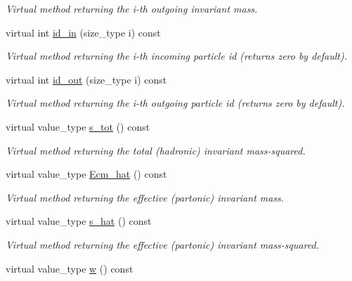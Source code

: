 \begin{DoxyCompactItemize}
\begin{DoxyCompactList}\small\item\em Virtual method returning the i-\/th outgoing invariant mass. \end{DoxyCompactList}\item 
virtual int \hyperlink{a00442_a93226df13fcf52eb52b5b8d894885462}{id\-\_\-in} (size\-\_\-type i) const 
\begin{DoxyCompactList}\small\item\em Virtual method returning the i-\/th incoming particle id (returns zero by default). \end{DoxyCompactList}\item 
virtual int \hyperlink{a00442_a30cad3b16698c3d0d47d01b0a2d61df2}{id\-\_\-out} (size\-\_\-type i) const 
\begin{DoxyCompactList}\small\item\em Virtual method returning the i-\/th outgoing particle id (returns zero by default). \end{DoxyCompactList}\item 
\hypertarget{a00442_a23b8eb4a43103ad601f6e46c6f6c6736}{virtual value\-\_\-type \hyperlink{a00442_a23b8eb4a43103ad601f6e46c6f6c6736}{s\-\_\-tot} () const }\label{a00442_a23b8eb4a43103ad601f6e46c6f6c6736}

\begin{DoxyCompactList}\small\item\em Virtual method returning the total (hadronic) invariant mass-\/squared. \end{DoxyCompactList}\item 
virtual value\-\_\-type \hyperlink{a00442_a42bcfbb7c8fcb5444f0cf3ab4259d8cc}{Ecm\-\_\-hat} () const 
\begin{DoxyCompactList}\small\item\em Virtual method returning the effective (partonic) invariant mass. \end{DoxyCompactList}\item 
\hypertarget{a00442_a00ba806004e8b703ae16876d25de0424}{virtual value\-\_\-type \hyperlink{a00442_a00ba806004e8b703ae16876d25de0424}{s\-\_\-hat} () const }\label{a00442_a00ba806004e8b703ae16876d25de0424}

\begin{DoxyCompactList}\small\item\em Virtual method returning the effective (partonic) invariant mass-\/squared. \end{DoxyCompactList}\item 
\hypertarget{a00442_ae452c2c9e82b6e784bd32618c81d5ab1}{virtual value\-\_\-type \hyperlink{a00442_ae452c2c9e82b6e784bd32618c81d5ab1}{w} () const }\label{a00442_ae452c2c9e82b6e784bd32618c81d5ab1}


\end{DoxyCompactItemize}
